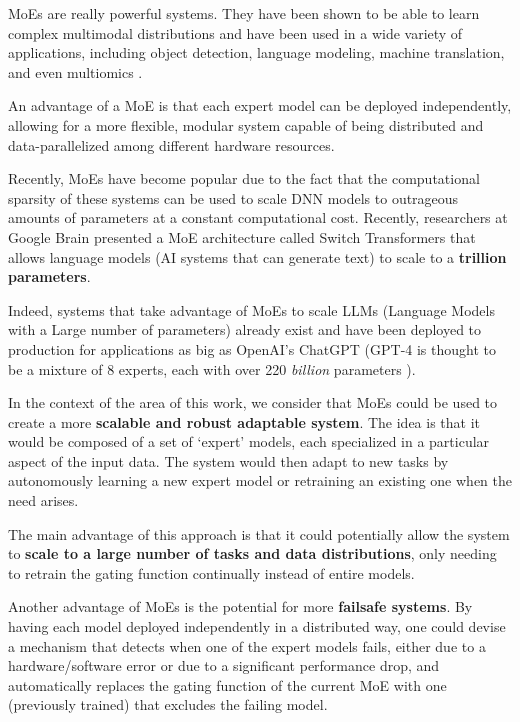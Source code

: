 \documentclass[../main.tex]{subfiles}
\begin{document}
    MoEs are really powerful systems. They have been shown to be able to learn complex multimodal distributions and have been used in a wide variety of applications, including object detection, language modeling, machine translation, and even multiomics \cite{hwang_tutel_2023,mustafa_multimodal_2022,shazeer_outrageously_2017, minoura_scmm_2021}.
    
    An advantage of a MoE is that each expert model can be deployed independently, allowing for a more flexible, modular system capable of being distributed and data-parallelized among different hardware resources. 

    Recently, MoEs have become popular due to the fact that the computational sparsity of these systems can be used to scale DNN models to outrageous amounts of parameters at a constant computational cost. Recently, researchers at Google Brain presented a MoE architecture called Switch Transformers \cite{fedusSwitchTransformersScaling2022a} that allows language models (AI systems that can generate text) to scale to a \textbf{trillion parameters}.
    
    Indeed, systems that take advantage of MoEs to scale LLMs (Language Models with a Large number of parameters) already exist and have been deployed to production for applications as big as OpenAI's ChatGPT (GPT-4 is thought to be a mixture of 8 experts, each with over 220 \textit{billion} parameters \cite{rickardMixtureExpertsGPT42023}).
    
    In the context of the area of this work, we consider that MoEs could be used to create a more \textbf{scalable and robust adaptable system}. The idea is that it would be composed of a set of `expert' models, each specialized in a particular aspect of the input data. The system would then adapt to new tasks by autonomously learning a new expert model or retraining an existing one when the need arises.
    
    The main advantage of this approach is that it could potentially allow the system to \textbf{scale to a large number of tasks and data distributions}, only needing to retrain the gating function continually instead of entire models. 
    
    Another advantage of MoEs is the potential for more \textbf{failsafe systems}. By having each model deployed independently in a distributed way, one could devise a mechanism that detects when one of the expert models fails, either due to a hardware/software error or due to a significant performance drop, and automatically replaces the gating function of the current MoE with one (previously trained) that excludes the failing model.
    
\end{document}
